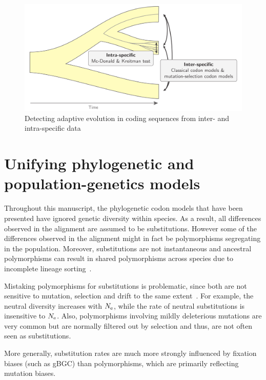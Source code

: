 \begin{figure}[htbp]
    \centering
    \includegraphics[width=\textwidth] {figures/inter-intra}
    \caption{Detecting adaptive evolution in coding sequences from inter- and intra-specific data}
    \label{fig:detecting-adaptation-inter-intra}
\end{figure}

\section{Unifying phylogenetic and population-genetics models}
\label{sec:unifying-phylogenetic-and-population-genetics-model}

Throughout this manuscript, the phylogenetic \gls{codon} models that have been presented have ignored genetic diversity within species.
As a result, all differences observed in the alignment are assumed to be \glspl{substitution}.
However some of the differences observed in the alignment might in fact be polymorphisms segregating in the population.
Moreover, \glspl{substitution} are not instantaneous and ancestral polymorphisms can result in shared polymorphisms across species due to incomplete lineage sorting~\citep{Charlesworth2010}.

Mistaking polymorphisms for \glspl{substitution} is problematic, since both are not sensitive to mutation, selection and drift to the same extent~\citep{Mugal2014}.
For example, the \gls{neutral} diversity increases with $N_{\text{e}}$, while the rate of \gls{neutral} \glspl{substitution} is insensitive to $N_{\text{e}}$.
Also, polymorphisms involving mildly deleterious mutations are very common but are normally filtered out by selection and thus, are not often seen as \glspl{substitution}.

More generally, \gls{substitution} rates are much more strongly influenced by fixation biases (such as gBGC) than polymorphisms, which are primarily reflecting mutation biases.

